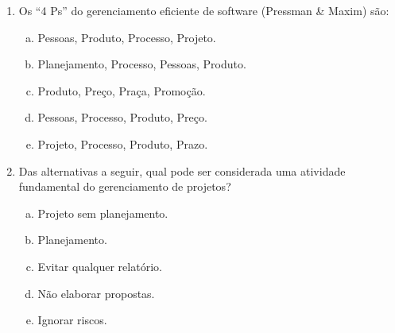 \documentclass{beamer}
\begin{document}
\begin{frame}
    \begin{enumerate}
        \justifying
        \setcounter{enumi}{2}
        \item<1-2> Os ``4 Ps'' do gerenciamento eficiente de software (Pressman \& Maxim) são:
            \begin{enumerate}[a)]
                \justifying
                \item<1-2> \alert<2>{Pessoas, Produto, Processo, Projeto}.
                \item<1-2> Planejamento, Processo, Pessoas, Produto.
                \item<1-2> Produto, Preço, Praça, Promoção.
                \item<1-2> Pessoas, Processo, Produto, Preço.
                \item<1-2> Projeto, Processo, Produto, Prazo.
            \end{enumerate}
        \item<3-4> Das alternativas a seguir, qual pode ser considerada uma atividade fundamental do gerenciamento de projetos?
            \begin{enumerate}[a)]
                \justifying
                \item<3-4> Projeto sem planejamento.
                \item<3-4> \alert<4>{Planejamento}.
                \item<3-4> Evitar qualquer relatório.
                \item<3-4> Não elaborar propostas.
                \item<3-4> Ignorar riscos.
            \end{enumerate}
    \end{enumerate}
\end{frame}
\end{document}
